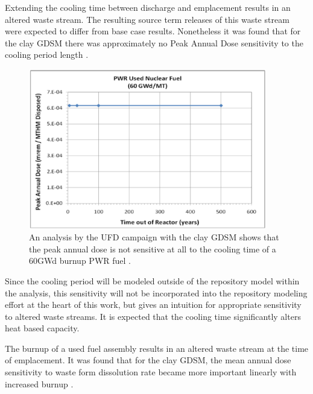 Extending the cooling time between discharge and emplacement results
in an altered waste stream. The resulting source term releases
of this waste stream were expected to differ from base case results. 
Nonetheless it was found that for the clay \gls{GDSM} there was approximately 
no Peak Annual Dose sensitivity to the cooling period length 
\cite{clayton_generic_2011}.

\begin{figure}[h!]
  \begin{center}
    \includegraphics[height=7cm]{./chapters/future/coolingTime.eps}
  \end{center}
  \caption[Cooling Time Peak Dose Sensitivity]{An analysis by the UFD campaign with the clay GDSM shows that
  the peak annual dose is not sensitive at all to the cooling time of a 60GWd 
  burnup PWR fuel \cite{clayton_generic_2011}.}
  \label{fig:coolingTime}
\end{figure}

Since the cooling period will be modeled outside of the repository model within  
the \Cyclus analysis, this sensitivity will not be incorporated into the 
repository modeling effort at the heart of this work, but gives an intuition for 
appropriate sensitivity to altered waste streams.  It is expected that the cooling 
time significantly alters heat based capacity. 


The burnup of a used fuel assembly results in an altered waste stream at the 
time of emplacement. It was found that for the clay \gls{GDSM}, the mean 
annual dose sensitivity to waste form dissolution rate became more important 
linearly with increased burnup \cite{clayton_generic_2011}.


